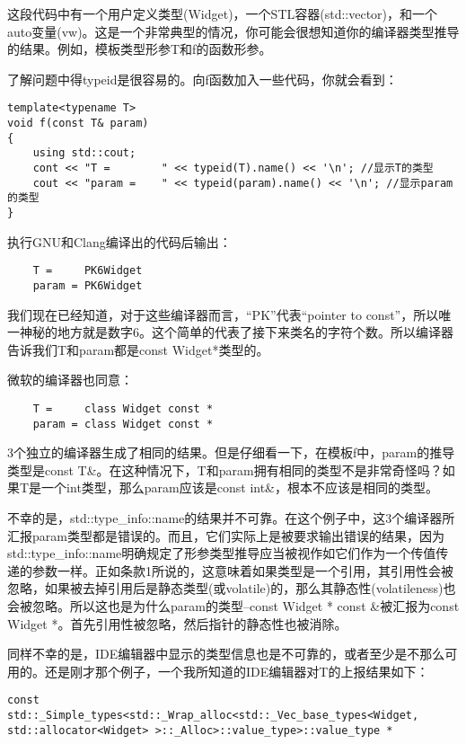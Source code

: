 这段代码中有一个用户定义类型(Widget)，一个STL容器(std::vector)，和一个auto变量(vw)。这是一个非常典型的情况，你可能会很想知道你的编译器类型推导的结果。例如，模板类型形参T和f的函数形参。

了解问题中得typeid是很容易的。向f函数加入一些代码，你就会看到：

\begin{lstlisting}
template<typename T>
void f(const T& param)
{
	using std::cout;
	cont << "T = 		" << typeid(T).name() << '\n'; //显示T的类型
	cout << "param = 	" << typeid(param).name() << '\n'; //显示param的类型
}
\end{lstlisting}

执行GNU和Clang编译出的代码后输出：

\begin{lstlisting}
	T =		PK6Widget
	param =	PK6Widget
\end{lstlisting}

我们现在已经知道，对于这些编译器而言，“PK”代表“pointer to const”，所以唯一神秘的地方就是数字6。这个简单的代表了接下来类名的字符个数。所以编译器告诉我们T和param都是const Widget*类型的。

微软的编译器也同意：

\begin{lstlisting}
	T =		class Widget const *
	param =	class Widget const *
\end{lstlisting}

3个独立的编译器生成了相同的结果。但是仔细看一下，在模板f中，param的推导类型是const T\&。在这种情况下，T和param拥有相同的类型不是非常奇怪吗？如果T是一个int类型，那么param应该是const int\&，根本不应该是相同的类型。

不幸的是，std::type\_info::name的结果并不可靠。在这个例子中，这3个编译器所汇报param类型都是错误的。而且，它们实际上是被要求输出错误的结果，因为std::type\_info::name明确规定了形参类型推导应当被视作如它们作为一个传值传递的参数一样。正如条款1所说的，这意味着如果类型是一个引用，其引用性会被忽略，如果被去掉引用后是静态类型(或volatile)的，那么其静态性(volatileness)也会被忽略。所以这也是为什么param的类型--const Widget * const \&被汇报为const Widget *。首先引用性被忽略，然后指针的静态性也被消除。

同样不幸的是，IDE编辑器中显示的类型信息也是不可靠的，或者至少是不那么可用的。还是刚才那个例子，一个我所知道的IDE编辑器对T的上报结果如下：

\begin{lstlisting}
const
std::_Simple_types<std::_Wrap_alloc<std::_Vec_base_types<Widget,
std::allocator<Widget> >::_Alloc>::value_type>::value_type *
\end{lstlisting}

